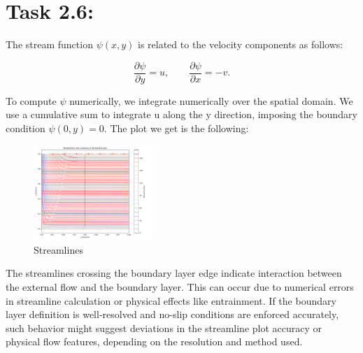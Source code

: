 \documentclass{article}
\begin{document}
\section*{\Large Task 2.6:}
The stream function $\psi(x, y)$ is related to the velocity components as follows:

\begin{equation}
\frac{\partial \psi}{\partial y} = u, \qquad \frac{\partial \psi}{\partial x} = -v.
\end{equation}

To compute $\psi$ numerically, we integrate numerically over the spatial domain. We use a cumulative sum to integrate u along the y direction, imposing the boundary condition $\psi(0, y) = 0$.
The plot we get is the following:

\begin{figure}[h!]
  \centering
  \includegraphics[width=0.4\textwidth]{task_2_6_fixed.png}
  \caption{Streamlines}
\end{figure}
The streamlines crossing the boundary layer edge indicate interaction between the external flow and the boundary layer. This can occur due to numerical errors in streamline calculation or physical effects like entrainment. If the boundary layer definition is well-resolved and no-slip conditions are enforced accurately, such behavior might suggest deviations in the streamline plot accuracy or physical flow features, depending on the resolution and method used.
\end{document}
